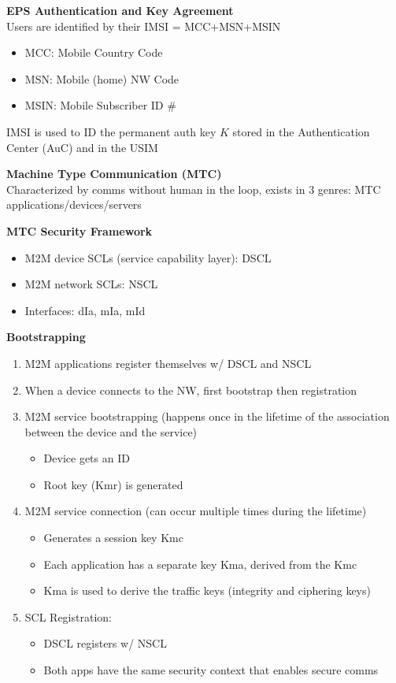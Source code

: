 \documentclass[10pt,letterpaper,landscape]{report}
\newcommand{\boxheight}{21.59cm}
\newcommand{\boxwidth}{8.85cm}
\begin{document}
\begin{small}
{\begin{minipage}[t][\boxheight][c]{\boxwidth}
    \textbf{EPS Authentication and Key Agreement}\\
    Users are identified by their IMSI = MCC+MSN+MSIN
    \begin{itemize}
        \item MCC: Mobile Country Code
        \item MSN: Mobile (home) NW Code
        \item MSIN: Mobile Subscriber ID \#
    \end{itemize}
    IMSI is used to ID the permanent auth key $K$ stored in the Authentication Center (AuC) and in the USIM
    
    \textbf{Machine Type Communication (MTC)}\\
    Characterized by comms without human in the loop, exists in 3 genres: MTC applications/devices/servers
    
    \textbf{MTC Security Framework}
    \begin{itemize}
        \item M2M device SCLs (service capability layer): DSCL
        \item M2M network SCLs: NSCL
        \item Interfaces: dIa, mIa, mId
    \end{itemize}
    
    \textbf{Bootstrapping}
    \begin{enumerate}
        \item M2M applications register themselves w/ DSCL and NSCL
        \item When a device connects to the NW, first bootstrap then registration
        \item M2M service bootstrapping (happens once in the lifetime of the association between the device and the service)
        \begin{itemize}
            \item Device gets an ID
            \item Root key (Kmr) is generated
        \end{itemize}
        \item M2M service connection (can occur multiple times during the lifetime)
        \begin{itemize}
            \item Generates a session key Kmc
            \item Each application has a separate key Kma, derived from the Kmc
            \item Kma is used to derive the traffic keys (integrity and ciphering keys)
        \end{itemize}
        \item SCL Registration:
        \begin{itemize}
            \item DSCL registers w/ NSCL
            \item Both apps have the same security context that enables secure comms
        \end{itemize}
    \end{enumerate}


\end{minipage}
}
\end{small}
\end{document}

